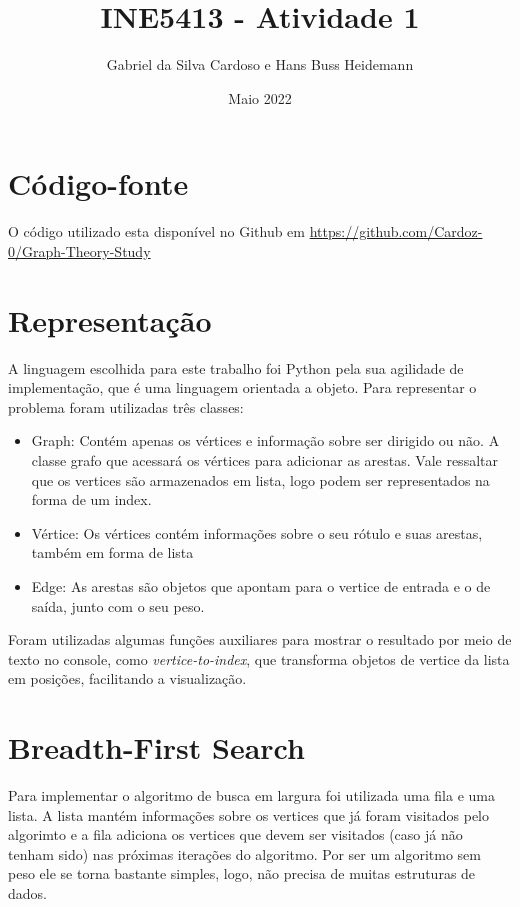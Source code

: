 \documentclass{article}
\title{INE5413 - Atividade 1}
\author{Gabriel da Silva Cardoso e Hans Buss Heidemann}
\date{Maio 2022}
\begin{document}
\maketitle

\section{Código-fonte}

O código utilizado esta disponível no Github em  \url{https://github.com/Cardoz-0/Graph-Theory-Study}


\section{Representação}
A linguagem escolhida para este trabalho foi Python pela sua agilidade de implementação, que é uma linguagem orientada a objeto. Para representar o problema foram utilizadas três classes:

\begin{itemize}
    \item Graph: Contém apenas os vértices e informação sobre ser dirigido ou não. A classe grafo que acessará os vértices para adicionar as arestas. Vale ressaltar que os vertices são armazenados em lista, logo podem ser representados na forma de um index.
    \item Vértice: Os vértices contém informações sobre o seu rótulo e suas arestas, também em forma de lista 
    \item Edge: As arestas são objetos que apontam para o vertice de entrada e o de saída, junto com o seu peso.
\end{itemize}

Foram utilizadas algumas funções auxiliares para mostrar o resultado por meio de texto no console, como \textit{vertice-to-index}, que transforma objetos de vertice da lista em posições, facilitando a visualização.

\section{Breadth-First Search}

Para implementar o algoritmo de busca em largura foi utilizada uma fila e uma lista. A lista mantém informações sobre os vertices que já foram visitados pelo algorimto e a fila adiciona os vertices que devem ser visitados (caso já não tenham sido) nas próximas iterações do algoritmo. 
Por ser um algoritmo sem peso ele se torna bastante simples, logo, não precisa de muitas estruturas de dados.
\end{document}
